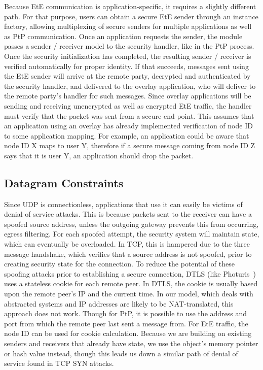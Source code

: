Because EtE communication is application-specific, it requires a slightly
different path.  For that purpose, users can obtain a secure EtE sender through
an instance factory, allowing multiplexing of secure senders for multiple
applications as well as PtP communication.  Once an application requests the
sender, the module passes a sender / receiver model to the security handler,
like in the PtP process.  Once the security initialization has completed, the
resulting sender / receiver is verified automatically for proper identity.
If that succeeds, messages sent using the EtE sender will arrive at the remote
party, decrypted and authenticated by the security handler, and delivered to the
overlay application, who will deliver to the remote party's handler for such
messages.  Since overlay applications will be sending and receiving unencrypted
as well as encrypted EtE traffic, the handler must verify that the packet was
sent from a secure end point.  This assumes that an application using an overlay
has already implemented verification of node ID to some application mapping.
For example, an application could be aware that node ID X maps to user Y,
therefore if a secure message coming from node ID Z says that it is user Y,
an application should drop the packet.

\subsection{Datagram Constraints}
Since UDP is connectionless, applications that use it can easily be victims of
denial of service attacks.  This is because packets sent to the receiver can
have a spoofed source address, unless the outgoing gateway prevents this from
occurring, egress filtering.  For each spoofed attempt, the security system
will maintain state, which can eventually be overloaded.  In TCP, this is
hampered due to the three message handshake, which verifies that a source
address is not spoofed, prior to creating security state for the connection.
To reduce the potential of these spoofing attacks prior to establishing a
secure connection, DTLS (like Photuris~\cite{photuris}) uses a stateless cookie
for each remote peer.  In DTLS, the cookie is usually based upon the remote
peer's IP and the current time.  In our model, which deals with abstracted
systems and IP addresses are likely to be NAT-translated, this approach does
not work.  Though for PtP, it is possible to use the address and port from
which the remote peer last sent a message from.  For EtE traffic, the node ID
can be used for cookie calculation.  Because we are building on existing
senders and receivers that already have state, we use the object's memory
pointer or hash value instead, though this leads us down a similar path of
denial of service found in TCP SYN attacks.

